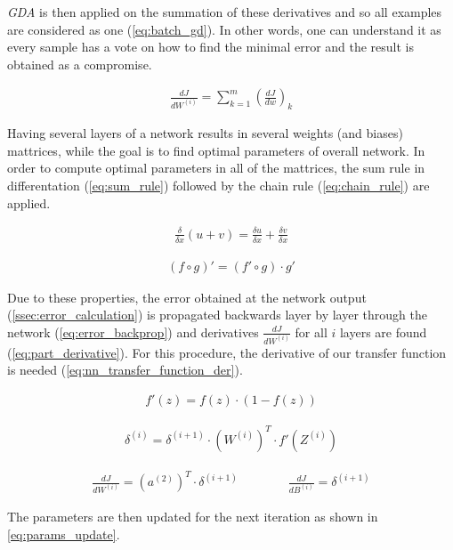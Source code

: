 \textit{GDA} is then applied on the summation of these derivatives and so all examples are considered as one (\cref{eq:batch_gd}). In other words, one can understand it as every sample has a vote on how to find the minimal error and the result is obtained as a compromise.

\begin{align} \label{eq:batch_gd}
\frac{dJ}{dW^{(i)}} =  \displaystyle{\sum_{k=1}^m} (\frac{dJ}{dw})_k
\end{align}

Having several layers of a network results in several weights (and biases) mattrices, while the goal is to find optimal parameters of overall network. In order to compute optimal parameters in all of the mattrices, the sum rule in differentation (\cref{eq:sum_rule}) followed by the chain rule (\cref{eq:chain_rule}) are applied.

\begin{align} \label{eq:sum_rule}
\frac{\delta}{\delta x} (u+v) = \frac{\delta u}{\delta x} + \frac{\delta v}{\delta x}
\end{align}

\begin{align} \label{eq:chain_rule}
(f \circ g)' = (f' \circ g) \cdot g'
\end{align}

Due to these properties, the error obtained at the network output (\cref{ssec:error_calculation}) is propagated backwards layer by layer through the network (\cref{eq:error_backprop}) and derivatives $ \frac{dJ}{dW^{(i)}} $ for all $ i $ layers are found (\cref{eq:part_derivative}). For this procedure, the derivative of our transfer function is needed (\cref{eq:nn_transfer_function_der}).

\begin{align} \label{eq:nn_transfer_function_der}
f'(z) = f(z) \cdot (1-f(z))
\end{align}

\begin{align} \label{eq:error_backprop}
\delta^{(i)} = \delta^{(i+1)} \cdot (W^{(i)})^T \cdot f'(Z^{(i)})
\end{align}

\begin{align} \label{eq:part_derivative}
\frac{dJ}{dW^{(i)}} = (a^{(2)})^T \cdot \delta^{(i+1)} \qquad\qquad \frac{dJ}{dB^{(i)}} = \delta^{(i+1)}
\end{align}

The parameters are then updated for the next iteration as shown in \cref{eq:params_update}.

